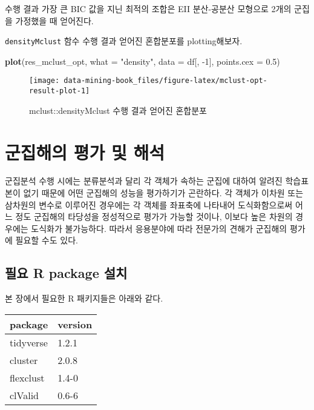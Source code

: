 \documentclass[]{book}
\newenvironment{Shaded}{\begin{snugshade}}{\end{snugshade}}
\newcommand{\DataTypeTok}[1]{\textcolor[rgb]{0.13,0.29,0.53}{#1}}
\newcommand{\DecValTok}[1]{\textcolor[rgb]{0.00,0.00,0.81}{#1}}
\newcommand{\FloatTok}[1]{\textcolor[rgb]{0.00,0.00,0.81}{#1}}
\newcommand{\KeywordTok}[1]{\textcolor[rgb]{0.13,0.29,0.53}{\textbf{#1}}}
\newcommand{\NormalTok}[1]{#1}
\newcommand{\StringTok}[1]{\textcolor[rgb]{0.31,0.60,0.02}{#1}}
\begin{document}
수행 결과 가장 큰 BIC 값을 지닌 최적의 조합은 EII 분산-공분산 모형으로 2개의 군집을 가정했을 때 얻어진다.

\texttt{densityMclust} 함수 수행 결과 얻어진 혼합분포를 plotting해보자.

\begin{Shaded}
\begin{Highlighting}[]
\KeywordTok{plot}\NormalTok{(res_mclust_opt, }\DataTypeTok{what =} \StringTok{"density"}\NormalTok{,}
     \DataTypeTok{data =}\NormalTok{ df[, }\DecValTok{-1}\NormalTok{], }\DataTypeTok{points.cex =} \FloatTok{0.5}\NormalTok{)}
\end{Highlighting}
\end{Shaded}

\begin{figure}

{\centering \texttt{[image: data-mining-book\_files/figure-latex/mclust-opt-result-plot-1]} 

}

\caption{mclust::densityMclust 수행 결과 얻어진 혼합분포}\label{fig:mclust-opt-result-plot}
\end{figure}

\hypertarget{cluster-solution-evaluation}{%
\chapter{군집해의 평가 및 해석}\label{cluster-solution-evaluation}}

군집분석 수행 시에는 분류분석과 달리 각 객체가 속하는 군집에 대하여 알려진 학습표본이 없기 때문에 어떤 군집해의 성능을 평가하기가 곤란하다. 각 객체가 이차원 또는 삼차원의 변수로 이루어진 경우에는 각 객체를 좌표축에 나타내어 도식화함으로써 어느 정도 군집해의 타당성을 정성적으로 평가가 가능할 것이나, 이보다 높은 차원의 경우에는 도식화가 불가능하다. 따라서 응용분야에 따라 전문가의 견해가 군집해의 평가에 필요할 수도 있다.

\hypertarget{cluster-solution-evaluation-packages-install}{%
\section{필요 R package 설치}\label{cluster-solution-evaluation-packages-install}}

본 장에서 필요한 R 패키지들은 아래와 같다.

\begin{tabular}{l|l}
\hline
package & version\\
\hline
tidyverse & 1.2.1\\
\hline
cluster & 2.0.8\\
\hline
flexclust & 1.4-0\\
\hline
clValid & 0.6-6\\
\hline
\end{tabular}
\end{document}
